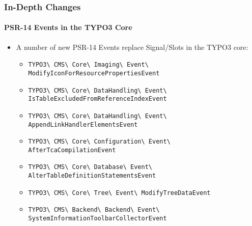 \begin{frame}[fragile]
	\frametitle{In-Depth Changes}
	\framesubtitle{PSR-14 Events in the TYPO3 Core}

	\begin{itemize}
		\item A number of new PSR-14 Events replace Signal/Slots in the TYPO3 core:
			\newline

			\begin{itemize}\tiny
				\item \texttt{TYPO3\textbackslash
					CMS\textbackslash
					Core\textbackslash
					Imaging\textbackslash
					Event\textbackslash
					ModifyIconForResourcePropertiesEvent}
					\newline
				\item \texttt{TYPO3\textbackslash
					CMS\textbackslash
					Core\textbackslash
					DataHandling\textbackslash
					Event\textbackslash
					IsTableExcludedFromReferenceIndexEvent}
					\newline
				\item \texttt{TYPO3\textbackslash
					CMS\textbackslash
					Core\textbackslash
					DataHandling\textbackslash
					Event\textbackslash
					AppendLinkHandlerElementsEvent}
					\newline
				\item \texttt{TYPO3\textbackslash
					CMS\textbackslash
					Core\textbackslash
					Configuration\textbackslash
					Event\textbackslash
					AfterTcaCompilationEvent}
					\newline
				\item \texttt{TYPO3\textbackslash
					CMS\textbackslash
					Core\textbackslash
					Database\textbackslash
					Event\textbackslash
					AlterTableDefinitionStatementsEvent}
					\newline
				\item \texttt{TYPO3\textbackslash
					CMS\textbackslash
					Core\textbackslash
					Tree\textbackslash
					Event\textbackslash
					ModifyTreeDataEvent}
					\newline
				\item \texttt{TYPO3\textbackslash
					CMS\textbackslash
					Backend\textbackslash
					Backend\textbackslash
					Event\textbackslash
					SystemInformationToolbarCollectorEvent}
					\newline
			\end{itemize}

	\end{itemize}

\end{frame}

